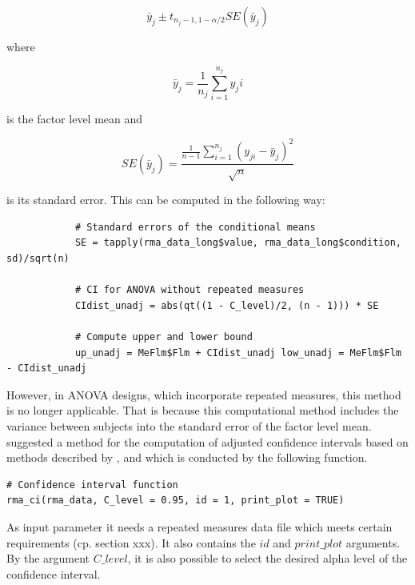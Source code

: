 \documentclass[11pt]{article}
\begin{document}
		\begin{equation}
			\bar{y}_j \pm t_{n_j - 1,1-\alpha/2 }SE(\bar{y}_j)
		\end{equation}
		
		where 
		
		\begin{equation}
			\bar{y}_j = \frac{1}{n_j}\sum_{i=1}^{n_j}y_ji
		\end{equation}
		
		is the factor level mean and
		
		
		
		\begin{equation}
			SE(\bar{y}_j) = \frac{\frac{1}{n-1}\sum_{i=1}^{n_j}(y_{ji}-\bar{y}_j)^2}{\sqrt{n}}
		\end{equation}
		
		\vspace{4 mm}
		
		is its standard error. This can be computed in the following way:\\
		
		\begin{lstlisting}
			# Standard errors of the conditional means 
			SE = tapply(rma_data_long$value, rma_data_long$condition, sd)/sqrt(n)
			
			# CI for ANOVA without repeated measures 
			CIdist_unadj = abs(qt((1 - C_level)/2, (n - 1))) * SE
			
			# Compute upper and lower bound 
			up_unadj = MeFlm$Flm + CIdist_unadj low_unadj = MeFlm$Flm - CIdist_unadj
		\end{lstlisting}
		
		However, in ANOVA designs, which incorporate repeated measures, this method is no longer applicable. That is because this computational method includes the variance between subjects into the standard error of the factor level mean.\\
		
		\cite{o2014representing} suggested a method for the computation of adjusted confidence intervals based on methods described by \cite{loftus1994using}, \cite{cousineau2005confidence} and \cite{morey2008confidence} which is conducted by the following function.\\
		
		\begin{lstlisting}
# Confidence interval function
rma_ci(rma_data, C_level = 0.95, id = 1, print_plot = TRUE)
		\end{lstlisting}
		
		As input parameter it needs a repeated measures data file which meets certain requirements (cp. section xxx). It also contains the $id$ and $print\_plot$ arguments. By the argument $C\_level$, it is also possible to select the desired alpha level of the confidence interval.\\
		
\end{document}
